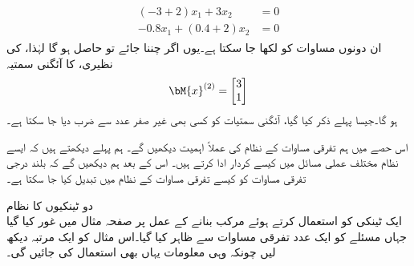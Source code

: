 \begin{gather*}
\begin{aligned}
(-3+2)x_1+3x_2&=0\\
-0.8x_1+(0.4+2)x_2&=0
\end{aligned}
\end{gather*}
ان دونوں مساوات کو  لکھا جا سکتا ہے۔یوں اگر  چننا جائے تو  حاصل ہو گا لہٰذا،  کی نظیری،  کا آئگنی سمتیہ 
\begin{align*}
\bM{x}^{(2)}=
\begin{bmatrix*}[r]
3\\
1
\end{bmatrix*}
\end{align*}
ہو گا۔جیسا پہلے ذکر کیا گیا، آئگنی سمتیات کو کسی  بھی غیر صفر عدد سے ضرب دیا جا سکتا ہے۔

اس حصے میں ہم  تفرقی مساوات کے نظام کی عملاً اہمیت دیکھیں گے۔ ہم پہلے دیکھتے ہیں کہ ایسے نظام مختلف عملی مسائل میں کیسے کردار ادا کرتے ہیں۔ اس کے بعد ہم دیکھیں گے کہ بلند درجی تفرقی مساوات کو کیسے تفرقی مساوات کے نظام میں تبدیل کیا جا سکتا ہے۔

\quad دو ٹینکیوں کا نظام\\
ایک ٹینکی کو استعمال کرتے ہوئے مرکب بنانے کے عمل پر صفحہ  مثال  میں غور کیا گیا جہاں مسئلے کو ایک عدد تفرقی مساوات سے ظاہر کیا گیا۔اس مثال کو ایک مرتبہ دیکھ لیں چونکہ وہی معلومات یہاں بھی استعمال کی جائیں گی۔
 
